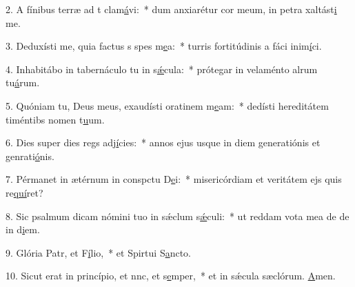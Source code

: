 2. A fínibus terræ ad t clam\uline{á}vi:~* dum anxiarétur cor meum, in petra xaltást\uline{i} me.\par 
3. Deduxísti me, quia factus s spes m\uline{e}a:~* turris fortitúdinis a fáci inim\uline{í}ci.\par 
4. Inhabitábo in tabernáculo tu in s\uline{ǽ}cula:~* prótegar in velaménto alrum tu\uline{á}rum.\par 
5. Quóniam tu, Deus meus, exaudísti oratinem m\uline{e}am:~* dedísti hereditátem timéntibs nomen t\uline{u}um.\par 
6. Dies super dies regs adj\uline{í}cies:~* annos ejus usque in diem generatiónis et genrati\uline{ó}nis.\par 
7. Pérmanet in ætérnum in conspctu D\uline{e}i:~* misericórdiam et veritátem ejs quis re\uline{quí}ret?\par 
8. Sic psalmum dicam nómini tuo in sǽclum s\uline{ǽ}culi:~* ut reddam vota mea de de in d\uline{i}em.\par 
9. Glória Patr, et F\uline{í}lio,~* et Spirtui S\uline{a}ncto.\par 
10. Sicut erat in princípio, et nnc, et s\uline{e}mper,~* et in sǽcula sæclórum. \uline{A}men.\par 
